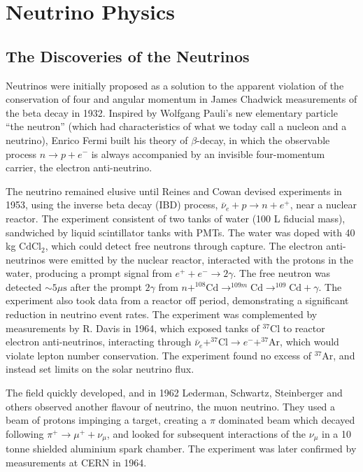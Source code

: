 \chapter{Neutrino Physics}
\label{chap:theory}
\section{The Discoveries of the Neutrinos}
Neutrinos were initially proposed as a solution to the apparent violation of the conservation of four and angular momentum in James Chadwick measurements of the beta decay in 1932\cite{Chadwick1,Chadwick2}. Inspired by Wolfgang Pauli's new elementary particle ``the neutron'' (which had characteristics of what we today call a nucleon and a neutrino)\cite{pauli_1933}, Enrico Fermi built his theory of $\beta$-decay\cite{fermi_1934}, in which the observable process $n \rightarrow p + e^-$ is always accompanied by an invisible four-momentum carrier, the electron anti-neutrino.

The neutrino remained elusive until Reines and Cowan devised experiments\cite{reines_cowan_1,reines_cowan_2} in 1953, using the inverse beta decay (IBD) process, $\bar{\nu}_e + p \rightarrow n + e^+$, near a nuclear reactor. The experiment consistent of two tanks of water (100 L fiducial mass), sandwiched by liquid scintillator tanks with PMTs. The water was doped with 40 kg $\text{CdCl}_2$, which could detect free neutrons through capture. The electron anti-neutrinos were emitted by the nuclear reactor, interacted with the protons in the water, producing a prompt signal from $e^+ + e^- \rightarrow 2\gamma$. The free neutron was detected $\sim5\mu\text{s}$ after the prompt $2\gamma$ from $n + ^{108}\text{Cd} \rightarrow ^{109m}\text{Cd} \rightarrow ^{109}\text{Cd} + \gamma$. The experiment also took data from a reactor off period, demonstrating a significant reduction in neutrino event rates. The experiment was complemented by measurements by R. Davis\cite{davis} in 1964, which exposed tanks of $^{37}\text{Cl}$ to reactor electron anti-neutrinos, interacting through $\bar{\nu}_e + ^{37}\text{Cl} \rightarrow e^- + ^{37}\text{Ar}$, which would violate lepton number conservation. The experiment found no excess of $^{37}\text{Ar}$, and instead set limits on the solar neutrino flux.

The field quickly developed, and in 1962 Lederman, Schwartz, Steinberger and others\cite{lederman} observed another flavour of neutrino, the muon neutrino. They used a beam of protons impinging a target, creating a $\pi$ dominated beam which decayed following $\pi^+ \rightarrow \mu^+ + \nu_\mu$, and looked for subsequent interactions of the $\nu_\mu$ in a 10 tonne shielded aluminium spark chamber. The experiment was later confirmed by measurements at CERN in 1964\cite{cern_spark,cern_spark2}.

